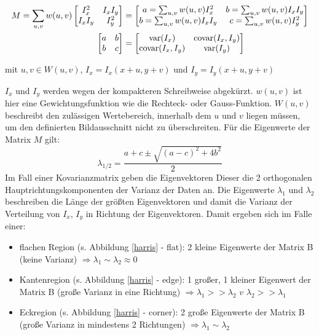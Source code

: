 \begin{align}
M = \sum_{u,v}{w(u,v)
\begin{bmatrix}
I_x^2 & I_xI_y\\
I_xI_y & I_y^2\\
\end{bmatrix}
}
&=
\begin{bmatrix}
a = \sum_{u,v}{w(u,v)I_x^2} & b = \sum_{u,v}{w(u,v)I_xI_y}\\
b = \sum_{u,v}{w(u,v)I_xI_y} & c = \sum_{u,v}{w(u,v)I_y^2}\\
\end{bmatrix}
\notag \\ \bigskip \bigskip \bigskip
\begin{bmatrix}
a & b\\
b & c\\
\end{bmatrix}
&=
\begin{bmatrix}
\text{var}(I_x) & \text{covar}(I_x,I_y)\\
\text{covar}(I_x,I_y) & \text{var}(I_y)\\
\end{bmatrix}
\end{align}
\vskip 5pt
\begin{flushleft}
mit  $u,v \in W(u,v)$, $I_x=I_x(x+u,y+v)$ und $I_y=I_y(x+u,y+v)$
\end{flushleft}
\vskip 5pt
$I_x$ und $I_y$ werden wegen der kompakteren Schreibweise abgekürzt.
$w(u,v)$ ist hier eine Gewichtungsfunktion wie die Rechteck- oder Gauss-Funktion. $W(u,v)$ beschreibt den zulässigen Wertebereich, innerhalb dem $u$ und $v$ liegen müssen, um den definierten Bildausschnitt nicht zu überschreiten. Für die Eigenwerte der Matrix $M$ gilt:
\begin{equation}
\lambda_{1/2} = \frac{a+c \pm \sqrt{(a-c)^2 + 4b^2}}{2}
\end{equation}
Im Fall einer Kovarianzmatrix geben die Eigenvektoren Dieser die 2 orthogonalen Hauptrichtungskomponenten der Varianz der Daten an. Die Eigenwerte $\lambda_1$ und $\lambda_2$ beschreiben die Länge der größten Eigenvektoren und damit die Varianz der Verteilung von $I_x$, $I_y$ in Richtung der Eigenvektoren. Damit ergeben sich im Falle einer:
\begin{itemize}
\item flachen Region (s. Abbildung \ref{harris} - flat): 2 kleine Eigenwerte der Matrix B (keine Varianz) $\Rightarrow \lambda_1\sim \lambda_2\approx 0$ 
\item Kantenregion (s. Abbildung \ref{harris} - edge): 1 großer, 1 kleiner Eigenwert der Matrix B (große Varianz in eine Richtung) $\Rightarrow \lambda_1 >> \lambda_2$ \hskip 5pt $v$ \hskip 5pt $\lambda_2 >> \lambda_1$
\item Eckregion (s. Abbildung \ref{harris} - corner): 2 große Eigenwerte der Matrix B (große Varianz in mindestens 2 Richtungen) $\Rightarrow \lambda_1\sim \lambda_2$ 
\end{itemize}

